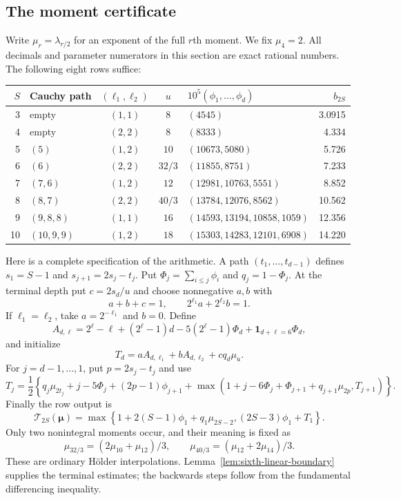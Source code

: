 \documentclass[11pt]{amsart}
\theoremstyle{definition}
\numberwithin{equation}{section}
\begin{document}
\subsection{The moment certificate}
\label{sec:g6-certificate}

Write $\mu_r=\lambda_{r/2}$ for an exponent of the full $r$th moment.
We fix $\mu_4=2$. All decimals and parameter numerators in this section
are exact rational numbers. The following eight rows suffice:
\begin{center}
\small
\begin{tabular}{@{}r l c c l r@{}}
\hline
$S$ & Cauchy path & $(\ell_1,\ell_2)$ & $u$ & $10^5(\phi_1,\ldots,\phi_d)$ & $b_{2S}$\\
\hline
3 & empty & $(1,1)$ & $8$ & $(4545)$ & 3.0915\\
4 & empty & $(2,2)$ & $8$ & $(8333)$ & 4.334\\
5 & $(5)$ & $(1,2)$ & $10$ & $(10673,5080)$ & 5.726\\
6 & $(6)$ & $(2,2)$ & $32/3$ & $(11855,8751)$ & 7.233\\
7 & $(7,6)$ & $(1,2)$ & $12$ & $(12981,10763,5551)$ & 8.852\\
8 & $(8,7)$ & $(2,2)$ & $40/3$ & $(13784,12076,8562)$ & 10.562\\
9 & $(9,8,8)$ & $(1,1)$ & $16$ & $(14593,13194,10858,1059)$ & 12.356\\
10 & $(10,9,9)$ & $(1,2)$ & $18$ & $(15303,14283,12101,6908)$ & 14.220\\
\hline
\end{tabular}
\end{center}

Here is a complete specification of the arithmetic. A path $(t_1,\ldots,t_{d-1})$
defines $s_1=S-1$ and $s_{j+1}=2s_j-t_j$. Put
$\Phi_j=\sum_{i\le j}\phi_i$ and $q_j=1-\Phi_j$.
At the terminal depth put $c=2s_d/u$ and choose nonnegative $a,b$ with
\[
 a+b+c=1,\qquad 2^{\ell_1}a+2^{\ell_2}b=1.
\]
If $\ell_1=\ell_2$, take $a=2^{-\ell_1}$ and $b=0$.
Define
\[
 A_{d,\ell}=2^\ell-\ell+(2^\ell-1)d
       -5(2^\ell-1)\Phi_d+\mathbf1_{d+\ell=6}\Phi_d,
\]
and initialize
\[
 T_d=aA_{d,\ell_1}+bA_{d,\ell_2}+cq_d\mu_u.
\]
For $j=d-1,\ldots,1$, put $p=2s_j-t_j$ and use
\[
 T_j=\frac12\left\{q_j\mu_{2t_j}+j-5\Phi_j+(2p-1)\phi_{j+1}
 +\max\left(1+j-6\Phi_j+\Phi_{j+1}+q_{j+1}\mu_{2p},T_{j+1}\right)\right\}.
\]
Finally the row output is
\[
 \mathcal T_{2S}(\boldsymbol\mu)=
 \max\left\{1+2(S-1)\phi_1+q_1\mu_{2S-2},
                         (2S-3)\phi_1+T_1\right\}.
\]
Only two nonintegral moments occur, and their meaning is fixed as
\[
 \mu_{32/3}=(2\mu_{10}+\mu_{12})/3,
 \qquad \mu_{40/3}=(\mu_{12}+2\mu_{14})/3.
\]
These are ordinary H\"older interpolations. Lemma~\ref{lem:sixth-linear-boundary} supplies the terminal estimates;
the backwards steps follow from the fundamental differencing inequality.
\end{document}
